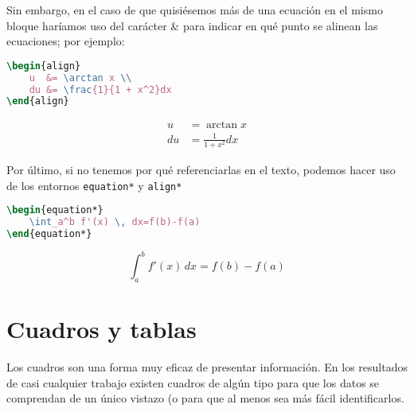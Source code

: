 Sin embargo, en el caso de que quisiésemos más de una ecuación en el mismo bloque haríamos uso del carácter \& para indicar en qué punto se alinean las ecuaciones; por ejemplo:

\begin{minipage}[h]{.5\textwidth}
\begin{lstlisting}[language=tex]
\begin{align}
    u  &= \arctan x \\ 
    du &= \frac{1}{1 + x^2}dx
\end{align}
\end{lstlisting}
\end{minipage}%
\begin{minipage}[h]{.5\textwidth}
\begin{align}
    u  &= \arctan x \\ 
    du &= \frac{1}{1 + x^2}dx
\end{align}
\end{minipage}

Por último, si no tenemos por qué referenciarlas en el texto, podemos hacer uso de los entornos \texttt{equation*} y \texttt{align*}

\begin{minipage}[c]{.5\textwidth}
\begin{lstlisting}[language=tex]
\begin{equation*}
	\int_a^b f'(x) \, dx=f(b)-f(a)
\end{equation*}
\end{lstlisting}
\end{minipage}%
\begin{minipage}[c]{.5\textwidth}
\begin{equation*}
	\int_a^b f'(x) \, dx=f(b)-f(a)
\end{equation*}
\end{minipage}

\section{Cuadros y tablas}

Los cuadros son una forma muy eficaz de presentar información. En los resultados de casi cualquier trabajo existen cuadros de algún tipo para que los datos se comprendan de un único vistazo (o para que al menos sea más fácil identificarlos.


